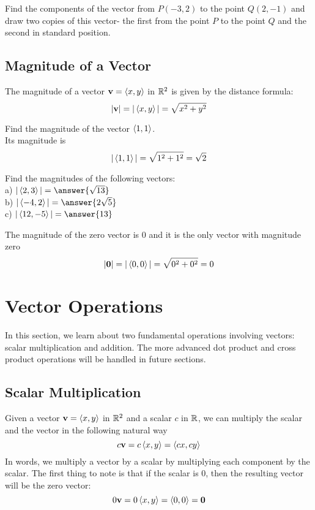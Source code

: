 \documentclass[handout]{ximera}
\begin{document}
\begin{problem}
Find the components of the vector from $P(-3, 2)$ to the point $Q(2, -1)$ and draw two copies of this vector- the first from the point $P$ to the point $Q$
and the second in standard position.\\
\end{problem}


\subsection{Magnitude of a Vector}

The magnitude of a vector $\mathbf{v} = \left\langle x,y\right\rangle$ in $\mathbb R^2$ is given by the distance formula:
\[
|\mathbf{v}| = |\left\langle x,y\right\rangle| = \sqrt{x^2 +y^2}
\]

\begin{example}
Find the magnitude of the vector $\left\langle 1,1\right\rangle$.\\
Its magnitude is
\[
|\left\langle 1,1\right\rangle| = \sqrt{1^2 +1^2} = \sqrt 2
\]
\end{example}

\begin{problem}
Find the magnitudes of the following vectors:\\
a) $|\vector{2,3}| = \answer{\sqrt{13}}$\\
b) $|\vector{-4,2}| = \answer{2\sqrt{5}}$\\
c) $|\vector{12,-5}| = \answer{13}$
\end{problem}

The magnitude of the zero vector is $0$ and it is the only vector with magnitude zero
\[
|\mathbf{0}| = |\left\langle 0,0\right\rangle| = \sqrt{0^2 +0^2} = 0
\]

\section{Vector Operations}
In this section, we learn about two fundamental operations involving vectors: scalar multiplication and addition.
The more advanced dot product and cross product operations will be handled in future sections.

\subsection{Scalar Multiplication}
Given a vector $\mathbf{v} = \left\langle x,y\right\rangle$ in $\mathbb R^2$ and a scalar $c$ in $\mathbb R$, we can multiply the scalar and the vector in the following
natural way
\[
c\mathbf{v} = c\left\langle x,y\right\rangle = \left\langle cx,cy\right\rangle
\]
In words, we multiply a vector by a scalar by multiplying each component by the scalar.
The first thing to note is that if the scalar is 0, then the resulting vector will be the zero vector:
\[
0\mathbf{v} = 0\left\langle x,y\right\rangle = \left\langle 0,0\right\rangle = \mathbf{0}
\]
\end{document}
